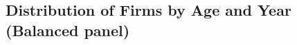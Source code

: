 \documentclass[12pt,notitlepage]{article}
\begin{document}
\begin{comment}
\begin{figure}[!htpb]
\centering
\caption{IPO and Sales per Employee}
\begin{subfigure}{.49\textwidth}
    \centering
    \subcaption{Italy}
 \texttt{[image: ../Output/IT/IPO\_YearMinusIPO\_SalesPerEmployee\_3yr]}
\end{subfigure}%
\begin{subfigure}{.49\textwidth}
    \centering
    \subcaption{Czech Republic}
 \texttt{[image: ../Output/CZ/IPO\_YearMinusIPO\_SalesPerEmployee\_3yr]}
\end{subfigure}
\begin{subfigure}{.49\textwidth}
    \centering
    \subcaption{France}
 \texttt{[image: ../Output/FR/IPO\_YearMinusIPO\_SalesPerEmployee\_3yr]}
\end{subfigure}%
\begin{subfigure}{.49\textwidth}
    \centering
    \subcaption{Hungary}
 \texttt{[image: ../Output/HU/IPO\_YearMinusIPO\_SalesPerEmployee\_3yr]}
\end{subfigure}
\end{figure}
\pagebreak

\begin{figure}[!htpb]
\centering
\caption{IPO and Profitability}
\begin{subfigure}{.49\textwidth}
    \centering
    \subcaption{Italy}
 \texttt{[image: ../Output/IT/IPO\_YearMinusIPO\_Profitability\_3yr]}
\end{subfigure}%
\begin{subfigure}{.49\textwidth}
    \centering
    \subcaption{Czech Republic}
 \texttt{[image: ../Output/CZ/IPO\_YearMinusIPO\_Profitability\_3yr]}
\end{subfigure}
\begin{subfigure}{.49\textwidth}
    \centering
    \subcaption{France}
 \texttt{[image: ../Output/FR/IPO\_YearMinusIPO\_Profitability\_3yr]}
\end{subfigure}%
\begin{subfigure}{.49\textwidth}
    \centering
    \subcaption{Hungary}
 \texttt{[image: ../Output/HU/IPO\_YearMinusIPO\_Profitability\_3yr]}
\end{subfigure}
\end{figure}
\pagebreak
\end{comment}

\subsection*{Distribution of Firms by Age and Year (Balanced panel)}
\end{document}
